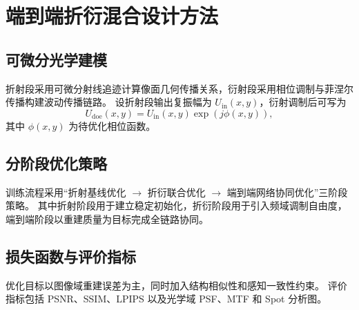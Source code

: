 \chapter{端到端折衍混合设计方法}

\section{可微分光学建模}

折射段采用可微分射线追迹计算像面几何传播关系，衍射段采用相位调制与菲涅尔传播构建波动传播链路。
设折射段输出复振幅为 $U_{\mathrm{in}}(x,y)$，衍射调制后可写为
\begin{equation}
U_{\mathrm{doe}}(x,y) = U_{\mathrm{in}}(x,y)\exp\left(j\phi(x,y)\right),
\end{equation}
其中 $\phi(x,y)$ 为待优化相位函数。

\section{分阶段优化策略}

训练流程采用“折射基线优化 $\rightarrow$ 折衍联合优化 $\rightarrow$ 端到端网络协同优化”三阶段策略。
其中折射阶段用于建立稳定初始化，折衍阶段用于引入频域调制自由度，端到端阶段以重建质量为目标完成全链路协同。

\section{损失函数与评价指标}

优化目标以图像域重建误差为主，同时加入结构相似性和感知一致性约束。
评价指标包括 PSNR、SSIM、LPIPS 以及光学域 PSF、MTF 和 Spot 分析图。
